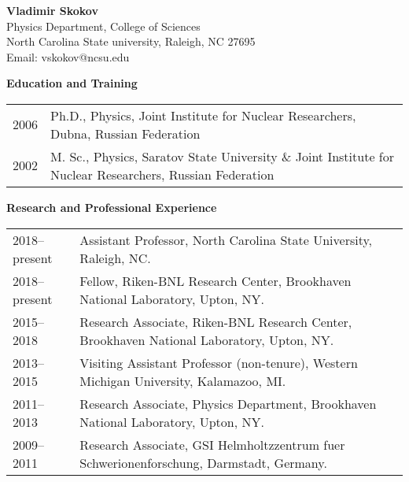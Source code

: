 
\begin{center}
   {\large\bf Vladimir Skokov} \\[0.25em]
    Physics Department, College of Sciences \\
    North Carolina State university, Raleigh, NC 27695 \\
    Email: vskokov@ncsu.edu
\end{center}

\noindent\textbf{Education and Training}

\vspace{0.6em}
\begin{tabular}{rp{5.6in}}
	2006 & Ph.D., Physics, Joint Institute for Nuclear Researchers, Dubna, Russian Federation \\[0.5em]
	2002 & M. Sc., Physics, Saratov State University \& Joint Institute for Nuclear Researchers, Russian Federation \\[0.5em]
\end{tabular}
\vspace{0.6em}
    
\noindent\textbf{Research and Professional Experience}

\vspace{0.6em}
\begin{tabular}{lp{5in}}
    {2018--present} & Assistant Professor, 
	North Carolina State University, 
	Raleigh, NC. \\[0.5em]
    {2018--present} & Fellow, 
	Riken-BNL Research Center, 
	Brookhaven National Laboratory, 
	Upton, NY. \\[0.5em]
    {2015--2018} & Research Associate, 
	Riken-BNL Research Center, 
	Brookhaven National Laboratory, 
	Upton, NY. \\[0.5em]
    {2013--2015} & Visiting Assistant Professor (non-tenure), 
	Western Michigan University, 
	Kalamazoo, MI.  \\[0.5em]
    {2011--2013} & Research Associate, 
	Physics Department, 
	Brookhaven National Laboratory, 
	Upton, NY. \\[0.5em]
    {2009--2011} & Research Associate, 
	GSI Helmholtzzentrum fuer Schwerionenforschung, 
	Darmstadt, Germany. \\[0.5em]
\end{tabular}

\vspace{0.6em}

